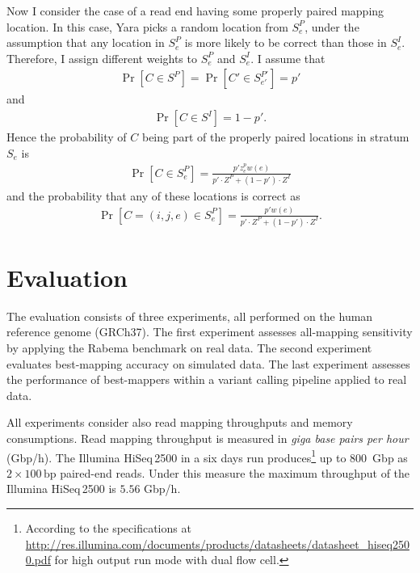 Now I consider the case of a read end having some properly paired mapping location.
In this case, Yara picks a random location from $S^P_e$, under the assumption that any location in $S^P_e$ is more likely to be correct than those in $S^I_e$.
Therefore, I assign different weights to $S^P_e$ and $S^I_e$.
I assume that
\begin{eqnarray}
\Pr[C \in S^P] = \Pr[C' \in S^{P'}_{e'}] = p'
\end{eqnarray}
and 
\begin{eqnarray}
\Pr[C \in S^I] = 1 - p'.
\end{eqnarray}
Hence the probability of $C$ being part of the properly paired locations in stratum $S_e$ is
\begin{eqnarray}
\label{eq:yara:mqual:pe:stratum}
\Pr[C \in S^P_e] = \frac{p' z^p_e w(e)}{p' \cdot Z^P + (1-p') \cdot Z^I}
\end{eqnarray}
and the probability that any of these locations is correct as
\begin{eqnarray}
\label{eq:yara:mqual:pe:paired}
\Pr[C = (i,j,e) \in S^P_e] = \frac{p' w(e)}{p' \cdot Z^P + (1-p') \cdot Z^I}.
\end{eqnarray}



\section{Evaluation}
\label{sec:yara:eval}

The evaluation consists of three experiments, all performed on the human reference genome (GRCh37).
The first experiment assesses all-mapping sensitivity by applying the Rabema benchmark on real data.
The second experiment evaluates best-mapping accuracy on simulated data.
The last experiment assesses the performance of best-mappers within a variant calling pipeline applied to real data.

All experiments consider also read mapping throughputs and memory consumptions.
Read mapping throughput is measured in \emph{giga base pairs per hour} (Gbp/h).
The Illumina HiSeq\,2500 in a six days run produces\footnote{According to the specifications at \url{http://res.illumina.com/documents/products/datasheets/datasheet_hiseq2500.pdf} for high output run mode with dual flow cell.} up to 800~Gbp as $2 \times 100\,\text{bp}$ paired-end reads.
Under this measure the maximum throughput of the Illumina HiSeq\,2500 is $5.56$ Gbp/h.

